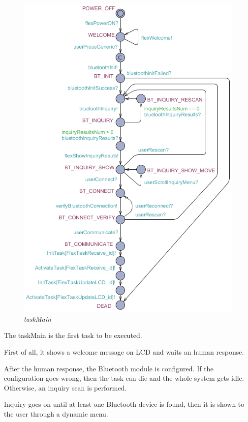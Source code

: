 \documentclass[paper=a4, fontsize=11pt]{scrartcl} %
\numberwithin{equation}{section} %
\numberwithin{figure}{section} %
\numberwithin{table}{section} %
\begin{document}
\begin{figure}[H]
  \centering
  \includegraphics[width=5.7in]{img/FLEX-OBD-LCD_taskMain}
  \caption{\textit{taskMain}}
\end{figure}

The taskMain is the first task to be executed.

First of all, it shows a welcome message on LCD and waits an human response.

After the human response, the Bluetooth module is configured. If the configuration goes wrong, then the task can die and the whole system gets idle. Otherwise, an inquiry scan is performed.

Inquiry goes on until at least one Bluetooth device is found, then it is shown to the user through a dynamic menu.
\end{document}
